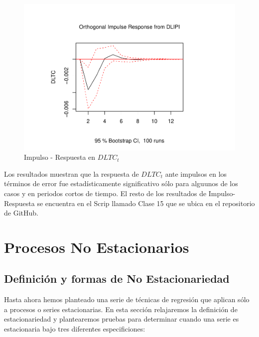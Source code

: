 \documentclass[
]{book}
\begin{document}
\begin{figure}

{\centering \includegraphics{Notas-Series-Tiempo_files/figure-latex/fig64-5} 

}

\caption{Impulso - Respuesta en $DLTC_t$}\label{fig:fig64-5}
\end{figure}

Los resultados muestran que la respuesta de \(DLTC_t\) ante impulsos en los términos de error fue estadísticamente significativo sólo para alguunos de los casos y en periodos cortos de tiempo. El resto de los resultados de Impulso-Respuesta se encuentra en el Scrip llamado Clase 15 que se ubica en el repositorio de GitHub.

\hypertarget{procesos-no-estacionarios}{%
\chapter{Procesos No Estacionarios}\label{procesos-no-estacionarios}}

\hypertarget{definiciuxf3n-y-formas-de-no-estacionariedad}{%
\section{Definición y formas de No Estacionariedad}\label{definiciuxf3n-y-formas-de-no-estacionariedad}}

Hasta ahora hemos planteado una serie de técnicas de regresión que aplican sólo a procesos o series estacionarias. En esta sección relajaremos la definición de estacionariedad y plantearemos pruebas para determinar cuando una serie es estacionaria bajo tres diferentes especificiones:
\end{document}
